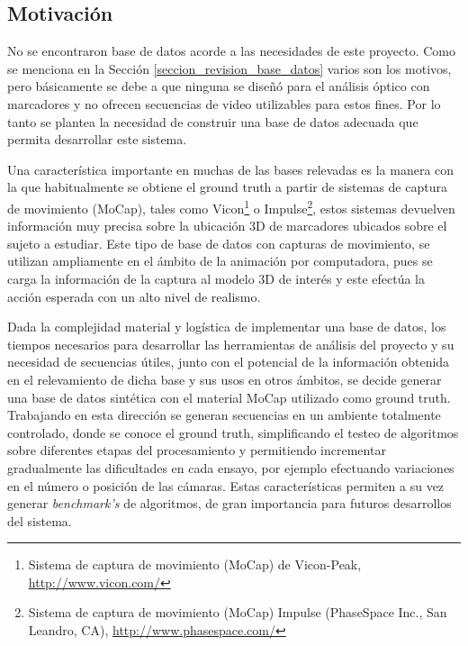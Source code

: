 \subsection{Motivación}

No se encontraron base de datos acorde a las necesidades de este proyecto. Como se menciona en la Sección \ref{seccion_revision_base_datos} varios son los motivos, pero básicamente se debe a que ninguna se diseñó para el análisis óptico  con marcadores y no ofrecen secuencias de video utilizables para estos fines. Por lo tanto se plantea la necesidad de construir una base de datos adecuada que permita desarrollar este sistema.


Una característica importante en muchas de las bases relevadas es la manera con la que habitualmente se obtiene el ground truth a partir de sistemas de captura de movimiento (MoCap), tales como Vicon\footnote{ Sistema  de captura de movimiento (MoCap) de Vicon-Peak, \textcolor{blue}{\underline{\url{http://www.vicon.com/}}} }
 o Impulse\footnote{ Sistema  de captura de movimiento (MoCap) Impulse (PhaseSpace Inc., San Leandro, CA), \textcolor{blue}{\underline{\url{http://www.phasespace.com/}}} },
estos sistemas devuelven información muy precisa sobre la ubicación 3D de marcadores ubicados sobre el sujeto a estudiar. Este tipo de base de datos con capturas de movimiento, se utilizan ampliamente en el ámbito de la animación por computadora, pues se carga la información de la captura al modelo 3D de interés y este efectúa la acción esperada con un alto nivel de realismo. 


Dada la complejidad material y logística de implementar una base de datos, los tiempos necesarios para desarrollar las herramientas de análisis del proyecto y su necesidad de secuencias útiles, junto con el potencial de la información obtenida en el relevamiento de dicha base y sus usos en otros ámbitos, se decide generar una base de datos sintética con el material MoCap utilizado como ground truth. Trabajando en esta dirección se generan secuencias en un ambiente totalmente controlado, donde se conoce el ground truth, simplificando el testeo de algoritmos sobre diferentes etapas del procesamiento y permitiendo incrementar gradualmente las dificultades  en cada ensayo, por ejemplo efectuando variaciones en el número o posición de las cámaras. Estas características permiten a su vez generar \emph{benchmark's} de algoritmos, de gran importancia para futuros desarrollos del sistema. 


